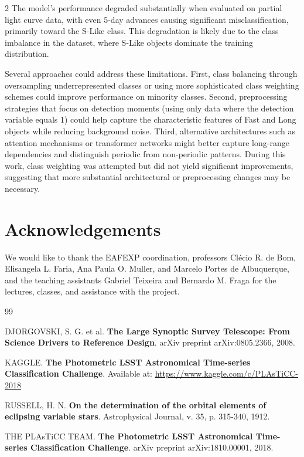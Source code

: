\documentclass[a4paper,twoside,12pt]{article}
\begin{document}
\begin{multicols}{2}
The model's performance degraded substantially when evaluated on partial light curve data, with even 5-day advances causing significant misclassification, primarily toward the S-Like class. This degradation is likely due to the class imbalance in the dataset, where S-Like objects dominate the training distribution.

Several approaches could address these limitations. First, class balancing through oversampling underrepresented classes or using more sophisticated class weighting schemes could improve performance on minority classes. Second, preprocessing strategies that focus on detection moments (using only data where the detection variable equals 1) could help capture the characteristic features of Fast and Long objects while reducing background noise. Third, alternative architectures such as attention mechanisms or transformer networks might better capture long-range dependencies and distinguish periodic from non-periodic patterns. During this work, class weighting was attempted but did not yield significant improvements, suggesting that more substantial architectural or preprocessing changes may be necessary.

\section{Acknowledgements} 

We would like to thank the EAFEXP coordination, professors Clécio R. de Bom, Elisangela L. Faria, Ana Paula O. Muller, and Marcelo Portes de Albuquerque, and the teaching assistants Gabriel Teixeira and Bernardo M. Fraga for the lectures, classes, and assistance with the project.

\begin{thebibliography}{99}

 DJORGOVSKI, S. G. et al. \textbf{The Large Synoptic Survey Telescope: From Science Drivers to Reference Design}. arXiv preprint arXiv:0805.2366, 2008.

 KAGGLE. \textbf{The Photometric LSST Astronomical Time-series Classification Challenge}. Available at: \url{https://www.kaggle.com/c/PLAsTiCC-2018}

 RUSSELL, H. N. \textbf{On the determination of the orbital elements of eclipsing variable stars}. Astrophysical Journal, v. 35, p. 315-340, 1912.

 THE PLAsTiCC TEAM. \textbf{The Photometric LSST Astronomical Time-series Classification Challenge}. arXiv preprint arXiv:1810.00001, 2018.


\end{thebibliography}
\end{multicols}
\end{document}
